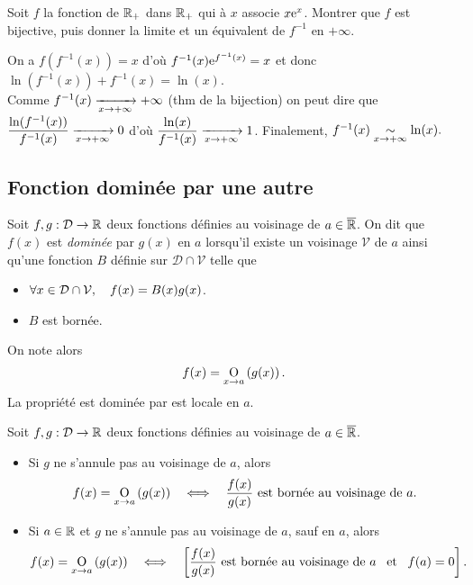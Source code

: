 \documentclass{magnoliaold}
\begin{document}
\begin{exoUnique}
\exo Soit $f$ la fonction de $\mathbb{R}_+$ dans $\mathbb{R}_+$ qui à $x$ associe $x{\rm e}^x$.
  Montrer que $f$ est bijective, puis donner la limite et un équivalent de
  $f^{-1}$ en $+\infty$.
  \begin{sol}
  On a $f(f^{-1}(x))=x$ d'où $f^{-1}(x){\rm e}^{f^{-1}(x)}=x$ et donc $\ln(f^{-1}(x))+f^{-1}(x)=\ln(x)$.\\
  
  Comme $f^{-1}(x)\xrightarrow[x\rightarrow +\infty]{}+\infty$ (thm de la bijection) on peut dire que $\dfrac{\ln(f^{-1}(x))}{f^{-1}(x)} \xrightarrow[x\rightarrow +\infty]{}0$ d'où $\dfrac{\ln(x)}{f^{-1}(x)} \xrightarrow[x\rightarrow +\infty]{}1$. Finalement, $f^{-1}(x)\underset{x\rightarrow +\infty}{\sim}\ln(x).$
  \end{sol}
\end{exoUnique}

\subsection{Fonction dominée par une autre}

\begin{definition}[utile=-3]
Soit $f,g:\mathcal{D}\to\mathbb{R}$ deux fonctions définies au voisinage de $a\in\overline{\mathbb{R}}$. On dit
que $f(x)$ est \emph{dominée} par $g(x)$ en $a$ lorsqu'il existe un voisinage $\mathcal{V}$ de $a$ ainsi qu'une fonction $B$ définie sur $\mathcal{D}\cap\mathcal{V}$ telle que
\begin{itemize}
\item $\forall x\in\mathcal{D}\cap\mathcal{V},\quad f(x)=B(x)g(x)$.
\item $B$ est bornée.
\end{itemize}
On note alors
\[f(x)=\underset{x \rightarrow a}{\text{O}}\left(g(x)\right).\]
La propriété \og est dominée par \fg est locale en $a$.
\end{definition}

\begin{proposition}[utile=-3]
Soit $f,g:\mathcal{D}\to\mathbb{R}$ deux fonctions définies au voisinage de $a\in\overline{\mathbb{R}}$.
\begin{itemize}
\item Si $g$ ne s'annule pas au voisinage de $a$, alors
  \[f(x)=\underset{x \rightarrow a}{\text{O}}\left(g(x)\right) \quad\Longleftrightarrow\quad
    \frac{f(x)}{g(x)} \text{ est bornée au voisinage de $a$.}\]
\item Si $a\in\mathbb{R}$ et $g$ ne s'annule pas au voisinage de $a$, sauf en $a$, alors
  \[f(x)=\underset{x \rightarrow a}{\text{O}}\left(g(x)\right) \quad\Longleftrightarrow\quad
    \left[\frac{f(x)}{g(x)}\text{ est bornée au voisinage de $a$}
    \quad\!\text{et}\quad\! f(a)=0\right].\]
\end{itemize}
\end{proposition}
\end{document}

